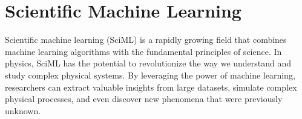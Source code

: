 





\section{Scientific Machine Learning}


Scientific machine learning (SciML) \cite{rackauckas2020universal,roscher2020explainable} is a rapidly growing field that combines machine learning algorithms with the fundamental principles of science. In physics, SciML has the potential to revolutionize the way we understand and study complex physical systems. By leveraging the power of machine learning, researchers can extract valuable insights from large datasets, simulate complex physical processes, and even discover new phenomena that were previously unknown.

